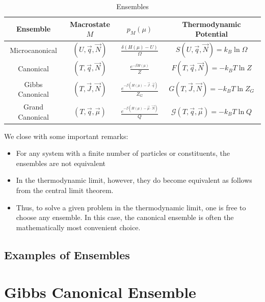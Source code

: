 \documentclass[12pt, a4paper, oneside, openright, titlepage]{book}
\begin{document}
\begin{table}[H]
    \centering
    \caption{Ensembles}
    \begin{tabular}{c|ccc}
        Ensemble & Macrostate $M$ & $p_M(\mu)$ & Thermodynamic Potential \\ \hline
        Microcanonical & $(U,\vec{q},\vec{N})$ & $\frac{\delta(H(\mu) - U)}{\Omega}$ & $S(U,\vec{q},\vec{N}) = k_B\ln \Omega$ \\
        Canonical & $(T,\vec{q},\vec{N})$ & $\frac{e^{-\beta H(\mu)}}{Z}$ & $F(T,\vec{q},\vec{N}) = -k_BT\ln Z$ \\
        Gibbs Canonical & $(T,\vec{J},\vec{N})$ & $\frac{e^{-\beta(H(\mu) - \vec{J}\cdot \vec{q})}}{Z_G}$ & $G(T,\vec{J},\vec{N}) = -k_BT\ln Z_G$ \\
        Grand Canonical & $(T,\vec{q},\vec{\mu})$ & $\frac{e^{-\beta(H(\mu)-\vec{\mu}\cdot \vec{N})}}{Q}$ & $\mathcal{G}(T,\vec{q},\vec{\mu}) = -k_BT\ln Q$ \\
    \end{tabular}
\end{table}

We close with some important remarks:

\begin{rmk}
    \leavevmode
    \begin{itemize}
        \item For any system with a finite number of particles or constituents, the ensembles are not equivalent
        \item In the thermodynamic limit, however, they do become equivalent as follows from the central limit theorem.
        \item Thus, to solve a given problem in the thermodynamic limit, one is free to choose any ensemble. In this case, the canonical ensemble is often the mathematically most convenient choice.
    \end{itemize}
\end{rmk}


\section{Examples of Ensembles}





\chapter{Gibbs Canonical Ensemble}
\end{document}

